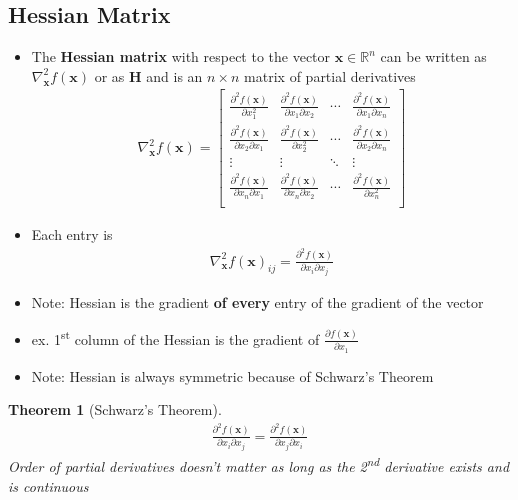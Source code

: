 \documentclass[letterpaper,12pt]{article}
\newcommand{\vect}[1]{\mathbf{#1}}
\newcommand{\matr}[1]{\mathbf{#1}}
\newtheorem{thm}{Theorem}
\begin{document}
\subsection{Hessian Matrix}
\begin{itemize}
 \item The \textbf{Hessian matrix} with respect to the vector $\vect{x} \in \mathbb{R}^n$ can be written as $\nabla_{\vect{x}}^2 f(\vect{x})$ or as $\matr{H}$ and is an $n \times n$ matrix of partial derivatives
       \begin{align}
        \nabla_{\vect{x}}^2 f(\vect{x}) = \begin{bmatrix}
         \frac{\partial^2 f(\vect{x})}{\partial x_1^2}            & \frac{\partial^2 f(\vect{x})}{\partial x_1 \partial x_2} & \cdots & \frac{\partial^2 f(\vect{x})}{\partial x_1 \partial x_n} \\
         \frac{\partial^2 f(\vect{x})}{\partial x_2 \partial x_1} & \frac{\partial^2 f(\vect{x})}{\partial x_2^2}            & \cdots & \frac{\partial^2 f(\vect{x})}{\partial x_2 \partial x_n} \\
         \vdots                                                   & \vdots                                                   & \ddots & \vdots                                                   \\
         \frac{\partial^2 f(\vect{x})}{\partial x_n \partial x_1} & \frac{\partial^2 f(\vect{x})}{\partial x_n \partial x_2} & \cdots & \frac{\partial^2 f(\vect{x})}{\partial x_n^2}            \\
        \end{bmatrix}
       \end{align}
 \item Each entry is
       \begin{align}
        \nabla_{\vect{x}}^2 f(\vect{x})_{ij} = \frac{\partial^2 f(\vect{x})}{\partial x_i \partial x_j}
       \end{align}
 \item Note: Hessian is the gradient \textbf{of every} entry of the gradient of the vector
 \item ex. 1\textsuperscript{st} column of the Hessian is the gradient of $\frac{\partial f(\vect{x})}{\partial x_1}$
 \item Note: Hessian is always symmetric because of Schwarz's Theorem
\end{itemize}

\begin{thm}[Schwarz's Theorem]
 \begin{align}
  \frac{\partial^2 f(\vect{x})}{\partial x_i \partial x_j} = \frac{\partial^2 f(\vect{x})}{\partial x_j \partial x_i}
 \end{align}
 Order of partial derivatives doesn't matter as long as the 2\textsuperscript{nd} derivative exists and is continuous
\end{thm}
\end{document}
